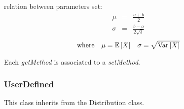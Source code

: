 \begin{description}
\begin{description}
\item relation between parameters set:
\begin{eqnarray*}
\mu                                       &       =       &   \frac{a+b}{2}       \\
\sigma                            &  =    &       \frac{b-a}{2\sqrt{3}}
\end{eqnarray*}
\begin{align*}
\mbox{where}
&&
\mu = {\mathbb E}\left[ X \right]
&&
\sigma = \sqrt{{\rm Var}\left[ X \right] }
\end{align*}
\end{description}
\bigskip

\item[Links:]  \rule{0pt}{1em}
\end{description}


Each \textit{getMethod} is associated to a \textit{setMethod}.




\newpage
\subsubsection{UserDefined}

This class inherits from the Distribution class.


